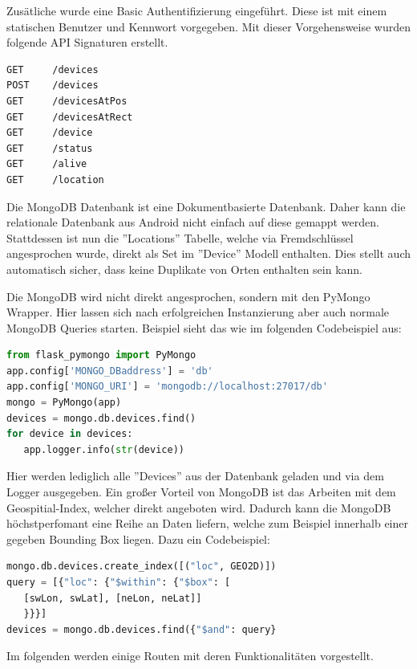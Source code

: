 \documentclass[11pt,a4paper]{article}
\begin{document}
\noindent Zusätliche wurde eine Basic Authentifizierung eingeführt. Diese ist mit einem statischen Benutzer und Kennwort vorgegeben.
Mit dieser Vorgehensweise wurden folgende API Signaturen erstellt. 

\begin{lstlisting}[]
GET     /devices
POST	/devices
GET     /devicesAtPos
GET     /devicesAtRect
GET     /device
GET     /status
GET     /alive
GET     /location
\end{lstlisting}

Die MongoDB Datenbank ist eine Dokumentbasierte Datenbank. Daher kann die relationale Datenbank aus Android nicht einfach auf diese gemappt werden. Stattdessen ist nun die ''Locations'' Tabelle, welche via Fremdschlüssel angesprochen wurde, direkt als Set im ''Device'' Modell enthalten. Dies stellt auch automatisch sicher, dass keine Duplikate von Orten enthalten sein kann.

Die MongoDB wird nicht direkt angesprochen, sondern mit den PyMongo Wrapper. Hier lassen sich nach erfolgreichen Instanzierung aber auch normale MongoDB Queries starten. Beispiel sieht das wie im folgenden Codebeispiel aus:

\begin{lstlisting}[language=Python]
from flask_pymongo import PyMongo
app.config['MONGO_DBaddress'] = 'db'
app.config['MONGO_URI'] = 'mongodb://localhost:27017/db'
mongo = PyMongo(app)
devices = mongo.db.devices.find()
for device in devices:
   app.logger.info(str(device))
\end{lstlisting}

Hier werden lediglich alle ''Devices'' aus der Datenbank geladen und via dem Logger ausgegeben. 
Ein großer Vorteil von MongoDB ist das Arbeiten mit dem Geospitial-Index, welcher direkt angeboten wird. Dadurch kann die MongoDB höchstperfomant eine Reihe an Daten liefern, welche zum Beispiel innerhalb einer gegeben Bounding Box liegen. Dazu ein Codebeispiel:

\begin{lstlisting}[language=Python]
mongo.db.devices.create_index([("loc", GEO2D)])
query = [{"loc": {"$within": {"$box": [
   [swLon, swLat], [neLon, neLat]]
   }}}]
devices = mongo.db.devices.find({"$and": query}
\end{lstlisting}


\newpage
\noindent
Im folgenden werden einige Routen mit deren Funktionalitäten vorgestellt.
\end{document}
